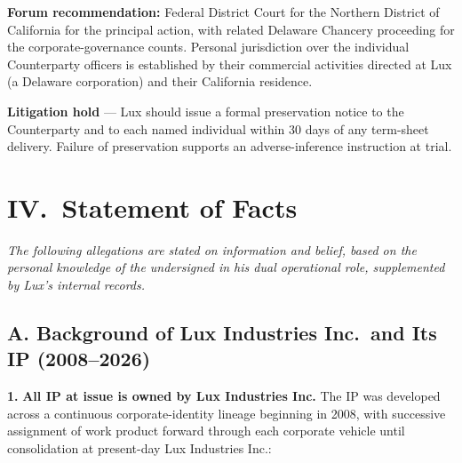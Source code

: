 \documentclass[11pt,letterpaper]{article}
\begin{document}
\textbf{Forum recommendation:} Federal District Court for the
Northern District of California for the principal action, with
related Delaware Chancery proceeding for the corporate-governance
counts. Personal jurisdiction over the individual Counterparty
officers is established by their commercial activities directed at
Lux (a Delaware corporation) and their California residence.

\textbf{Litigation hold} --- Lux should issue a formal preservation
notice to the Counterparty and to each named individual within 30
days of any term-sheet delivery. Failure of preservation supports an
adverse-inference instruction at trial.

\section*{IV.\ Statement of Facts}

\textit{The following allegations are stated on information and
belief, based on the personal knowledge of the undersigned in his
dual operational role, supplemented by Lux's internal records.}

\subsection*{A. Background of Lux Industries Inc.\ and Its IP (2008--2026)}

\textbf{1.} \textbf{All IP at issue is owned by Lux Industries Inc.}
The IP was developed across a continuous corporate-identity lineage
beginning in 2008, with successive assignment of work product
forward through each corporate vehicle until consolidation at
present-day Lux Industries Inc.:
\end{document}
